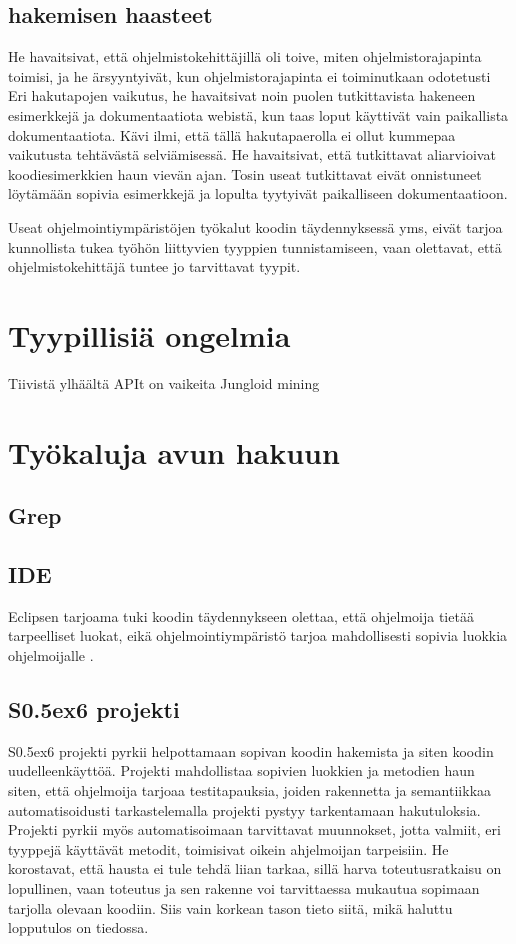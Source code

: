 \documentclass[finnish]{../tktltiki2}
\theoremstyle{definition}
\theoremstyle{remark}
\begin{document}
\subsection{hakemisen haasteet}
He havaitsivat, että ohjelmistokehittäjillä oli toive, miten ohjelmistorajapinta toimisi, ja he ärsyyntyivät, kun ohjelmistorajapinta ei toiminutkaan odotetusti \cite{asking-and-answering-api-questions}
Eri hakutapojen vaikutus, he havaitsivat noin puolen tutkittavista hakeneen esimerkkejä ja dokumentaatiota webistä, kun taas loput käyttivät vain paikallista dokumentaatiota. Kävi ilmi, että tällä hakutapaerolla ei ollut kummepaa vaikutusta tehtävästä selviämisessä. He havaitsivat, että tutkittavat aliarvioivat koodiesimerkkien haun vievän ajan. Tosin useat tutkittavat eivät onnistuneet löytämään sopivia esimerkkejä ja lopulta tyytyivät paikalliseen dokumentaatioon.  \cite{asking-and-answering-api-questions}

Useat ohjelmointiympäristöjen työkalut koodin täydennyksessä yms, eivät tarjoa kunnollista tukea työhön liittyvien tyyppien tunnistamiseen, vaan olettavat, että ohjelmistokehittäjä tuntee jo tarvittavat tyypit.  \cite{asking-and-answering-api-questions}


\section{Tyypillisiä ongelmia}
Tiivistä ylhäältä
APIt on vaikeita
  Jungloid mining

\section{Työkaluja avun hakuun}
\subsection{Grep}
\subsection{IDE}
Eclipsen tarjoama tuki koodin täydennykseen olettaa, että ohjelmoija tietää tarpeelliset luokat, eikä ohjelmointiympäristö tarjoa mahdollisesti sopivia luokkia ohjelmoijalle \cite{jungloid-mining}.
\subsection{S\raise0.5ex\hbox{6} projekti}
S\raise0.5ex\hbox{6} projekti pyrkii helpottamaan sopivan koodin hakemista ja siten koodin uudelleenkäyttöä. Projekti mahdollistaa sopivien luokkien ja metodien haun siten, että ohjelmoija tarjoaa testitapauksia, joiden rakennetta ja semantiikkaa automatisoidusti tarkastelemalla projekti pystyy tarkentamaan hakutuloksia. Projekti pyrkii myös automatisoimaan tarvittavat muunnokset, jotta valmiit, eri tyyppejä käyttävät metodit, toimisivat oikein ahjelmoijan tarpeisiin. He korostavat, että hausta ei tule tehdä liian tarkaa, sillä harva toteutusratkaisu on lopullinen, vaan toteutus ja sen rakenne voi tarvittaessa mukautua sopimaan tarjolla olevaan koodiin. Siis vain korkean tason tieto siitä, mikä haluttu lopputulos on tiedossa. \cite{what-to-search-for}
\end{document}
